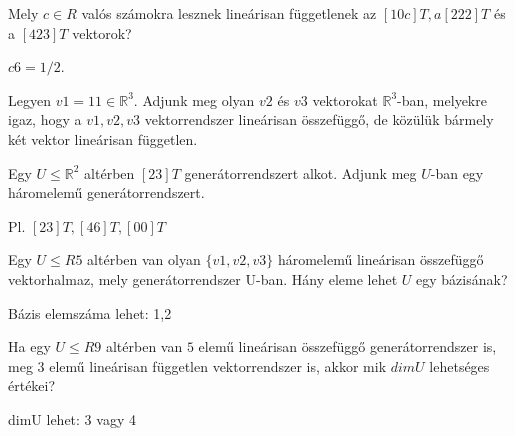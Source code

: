 \begin{frame}
  \begin{tcolorbox}[title={3/4. -R-}]
       Mely $c \in R$ valós számokra lesznek lineárisan függetlenek az $[1 0 c]T, a [2 2 2]T$ és a $[4 2 3]T$ vektorok?
  \tcblower

    \mmedskip 
  
    $c 6= 1/2$.
  \end{tcolorbox}
\end{frame}


\begin{frame}
  \begin{tcolorbox}[title={3/5. -R-}]
       Legyen $v1 = 1 1  \in \mathbb{R}^3$. Adjunk meg olyan $v2$ és $v3$ vektorokat $\mathbb{R}^3$-ban, melyekre igaz, hogy a $v1,v2,v3$ vektorrendszer lineárisan összefüggő, de közülük bármely két vektor lineárisan független.
  \tcblower

    \mmedskip 
  

  \end{tcolorbox}
\end{frame}


\begin{frame}
  \begin{tcolorbox}[title={3/6. -N-}]
        Egy $U \leq \mathbb{R}^2$ altérben $[2 3]T$ generátorrendszert alkot. Adjunk meg $U$-ban egy háromelemű generátorrendszert.
  \tcblower

    \mmedskip 
  
     Pl. $[2 3]T, [4 6]T, [0 0]T$
  \end{tcolorbox}
\end{frame}


\begin{frame}
  \begin{tcolorbox}[title={3/7. -R-}]
    Egy $U \leq R5$ altérben van olyan $\{v1,v2,v3\}$ háromelemű lineárisan összefüggő vektorhalmaz, mely generátorrendszer U-ban. Hány eleme lehet $U$ egy bázisának?
  \tcblower

    \mmedskip 
  
     Bázis elemszáma lehet: 1,2
  \end{tcolorbox}
\end{frame}


\begin{frame}
  \begin{tcolorbox}[title={3/8. -R-}]
    Ha egy $U \leq R9$ altérben van $5$ elemű lineárisan összefüggő generátorrendszer is, meg $3$ elemű lineárisan független vektorrendszer is, akkor mik $dimU$ lehetséges értékei?

  \tcblower

    \mmedskip 
  
     dimU lehet: 3 vagy 4
  \end{tcolorbox}
\end{frame}


